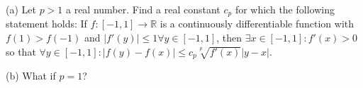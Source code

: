 (a) Let $p>1$ a real number. Find a real constant $c_p$ for which the following statement holds:
If $f: [-1,1]\rightarrow\mathbb{R}$ is a continuously differentiable function with $f(1)>f(-1)$ and $|f'(y)|\le1 \forall y\in[-1,1]$, then $\exists x\in[-1,1]: f'(x)>0$ so that $\forall y\in[-1,1]: |f(y)-f(x)|\le c_p\sqrt[p]{f'(x)}|y-x|$.

(b) What if $p=1$?